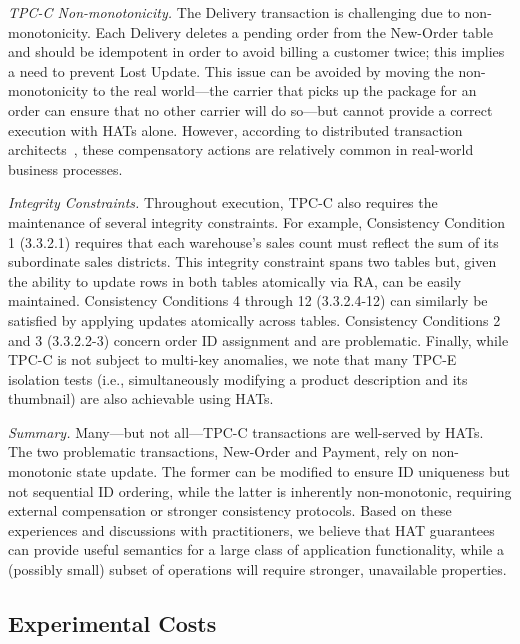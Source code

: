 \vspace{.5em}\noindent\textit{TPC-C Non-monotonicity.} The Delivery
transaction is challenging due to non-monotonicity. Each Delivery
deletes a pending order from the New-Order table and should be
idempotent in order to avoid billing a customer twice; this implies a
need to prevent Lost Update. This issue can be avoided by moving the
non-monotonicity to the real world---the carrier that picks up the
package for an order can ensure that no other carrier will do so---but
cannot provide a correct execution with HATs alone. However, according
to distributed transaction architects~\cite{entitygroup}, these
compensatory actions are relatively common in real-world business
processes.

\vspace{.5em}\noindent\textit{Integrity Constraints.} Throughout execution, TPC-C also requires the maintenance of several
integrity constraints. For example, Consistency Condition 1 (3.3.2.1)
requires that each warehouse's sales count must reflect the sum of its
subordinate sales districts. This integrity constraint spans two
tables but, given the ability to update rows in both tables atomically
via RA, can be easily maintained. Consistency Conditions 4 through 12
(3.3.2.4-12) can similarly be satisfied by applying updates atomically
across tables. Consistency Conditions 2 and 3 (3.3.2.2-3) concern
order ID assignment and are problematic. Finally, while TPC-C is not
subject to multi-key anomalies, we note that many TPC-E isolation
tests (i.e., simultaneously modifying a product description and its
thumbnail) are also achievable using HATs.

\vspace{.5em}\noindent\textit{Summary.} Many---but not all---TPC-C
transactions are well-served by HATs. The two problematic
transactions, New-Order and Payment, rely on non-monotonic state
update. The former can be modified to ensure ID uniqueness but not
sequential ID ordering, while the latter is inherently non-monotonic,
requiring external compensation or stronger consistency
protocols. Based on these experiences and discussions with
practitioners, we believe that HAT guarantees can provide useful
semantics for a large class of application functionality, while a
(possibly small) subset of operations will require stronger,
unavailable properties.

\subsection{Experimental Costs}
\label{sec:prototype}

